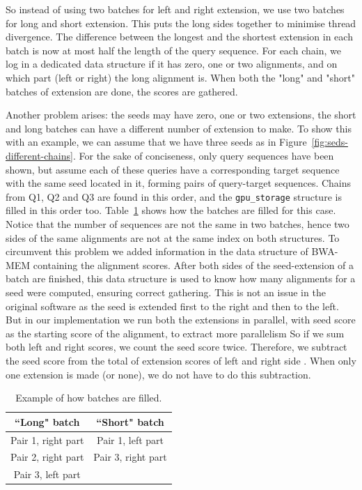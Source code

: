 So instead of using two batches for left and right extension, we use two batches for long and short extension. This puts the long sides together to minimise thread divergence. The difference between the longest and the shortest extension in each batch is now at most half the length of the query sequence. For each chain, we log in a dedicated data structure if it has zero, one or two alignments, and on which part (left or right) the long alignment is. When both the "long" and "short" batches of extension are done, the scores are gathered.

Another problem arises: the seeds may have zero, one or two extensions, the short and long batches can have a different number of extension to make. To show this with an example, we can assume that we have three seeds as in Figure~\ref{fig:seds-different-chains}. For the sake of conciseness, only query sequences have been shown, but assume each of these queries have a corresponding target sequence with the same seed located in it, forming pairs of query-target sequences. Chains from Q1, Q2 and Q3 are found in this order, and the \verb|gpu_storage| structure is filled in this order too. Table~\ref{tbl:batches} shows how the batches are filled for this case. Notice that the number of sequences are not the same in two batches, hence two sides of the same alignments are not at the same index on both structures. To circumvent this problem we added information in the data structure of BWA-MEM containing the alignment scores. After both sides of the seed-extension of a batch are finished, this data structure is used to know how many alignments for a seed were computed, ensuring correct gathering. This is not an issue in the original software as the seed is extended first to the right and then to the left. But in our implementation we run both the extensions in parallel, with seed score as the starting score of the alignment, to extract more parallelism  So if we sum both left and right scores, we count the seed score twice. Therefore, we subtract the seed score from the total of extension scores of left and right side . When only one extension is made (or none), we do not have to do this subtraction.

\begin{table}
	\centering
	\begin{tabular}{|c|c|}
		\hline 
		\textbf{``Long" batch} & \textbf{``Short" batch} \\ 
		\hline 
		Pair 1, right part & Pair 1, left part \\ 
		\hline 
		Pair 2, right part & Pair 3, right part \\ 
		\hline 
		Pair 3, left part &  \\ 
		\hline 
	\end{tabular} 
	\caption{Example of how batches are filled.}
	\label{tbl:batches}
\end{table}

